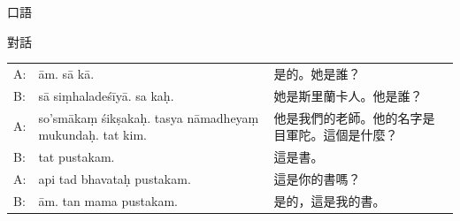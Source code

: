 \documentclass[aspectratio=169]{beamer}
\begin{document}
\begin{frame}{口語}
    \begin{block}{對話}
        \begin{tabularx}{\linewidth}{@{}LLL@{}}
            A:  & ām. sā kā. & 是的。她是誰？\\
            B:  & sā siṃhaladeśīyā. sa kaḥ. & 她是斯里蘭卡人。他是誰？\\
            A:  & so'smākaṃ śikṣakaḥ. tasya nāmadheyaṃ mukundaḥ. tat kim. & 他是我們的老師。他的名字是目軍陀。這個是什麼？\\
            B:  & tat pustakam. & 這是書。\\
            A:  & api tad bhavataḥ pustakam. & 這是你的書嗎？\\
            B:  & ām. tan mama pustakam. & 是的，這是我的書。
        \end{tabularx}
    \end{block}
\end{frame}
\end{document}
